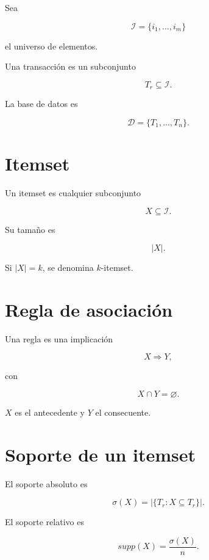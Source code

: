 \documentclass[
  spanish,
  10.5pt,
  letterpaper,
  DIV=11,
  numbers=noendperiod,
  oneside,
  open=any]{scrreprt}
\theoremstyle{definition}
\theoremstyle{definition}
\theoremstyle{plain}
\theoremstyle{remark}
\begin{document}

Sea

\[
\mathcal{I}
=
\{i_1,\ldots,i_m\}
\]

el universo de elementos.

Una transacción es un subconjunto

\[
T_r\subseteq\mathcal{I}.
\]

La base de datos es

\[
\mathcal{D}
=
\{T_1,\ldots,T_n\}.
\]

\section*{Itemset}\label{itemset}


Un itemset es cualquier subconjunto

\[
X\subseteq\mathcal{I}.
\]

Su tamaño es

\[
|X|.
\]

Si \(|X|=k\), se denomina \(k\)-itemset.

\section*{Regla de asociación}\label{regla-de-asociaciuxf3n}


Una regla es una implicación

\[
X\Rightarrow Y,
\]

con

\[
X\cap Y=\varnothing.
\]

\(X\) es el antecedente y \(Y\) el consecuente.

\section*{Soporte de un itemset}\label{soporte-de-un-itemset}


El soporte absoluto es

\[
\sigma(X)
=
\left|
\{T_r:X\subseteq T_r\}
\right|.
\]

El soporte relativo es

\[
supp(X)
=
\frac{\sigma(X)}{n}.
\]
\end{document}
